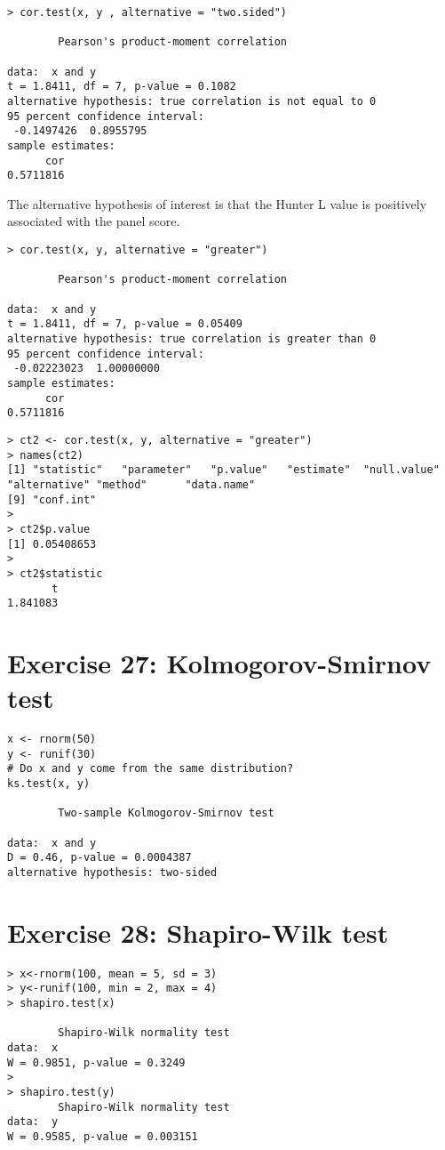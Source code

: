 \documentclass{article}
\begin{document}
\begin{verbatim}
> cor.test(x, y , alternative = "two.sided")

        Pearson's product-moment correlation

data:  x and y
t = 1.8411, df = 7, p-value = 0.1082
alternative hypothesis: true correlation is not equal to 0
95 percent confidence interval:
 -0.1497426  0.8955795
sample estimates:
      cor
0.5711816

\end{verbatim}


The alternative hypothesis of interest is that the
Hunter L value is positively associated with the panel score.
\begin{verbatim}
> cor.test(x, y, alternative = "greater")

        Pearson's product-moment correlation

data:  x and y
t = 1.8411, df = 7, p-value = 0.05409
alternative hypothesis: true correlation is greater than 0
95 percent confidence interval:
 -0.02223023  1.00000000
sample estimates:
      cor
0.5711816
\end{verbatim}

\begin{verbatim}
> ct2 <- cor.test(x, y, alternative = "greater")
> names(ct2)
[1] "statistic"   "parameter"   "p.value"   "estimate"  "null.value"  "alternative" "method"      "data.name"
[9] "conf.int"
>
> ct2$p.value
[1] 0.05408653
>
> ct2$statistic
       t
1.841083
\end{verbatim}

\section*{Exercise 27: Kolmogorov-Smirnov test}

\begin{verbatim}
x <- rnorm(50)
y <- runif(30)
# Do x and y come from the same distribution?
ks.test(x, y)

        Two-sample Kolmogorov-Smirnov test

data:  x and y
D = 0.46, p-value = 0.0004387
alternative hypothesis: two-sided
\end{verbatim}


\section*{Exercise 28: Shapiro-Wilk test}

\begin{verbatim}
> x<-rnorm(100, mean = 5, sd = 3)
> y<-runif(100, min = 2, max = 4)
> shapiro.test(x)

        Shapiro-Wilk normality test
data:  x
W = 0.9851, p-value = 0.3249
>
> shapiro.test(y)
        Shapiro-Wilk normality test
data:  y
W = 0.9585, p-value = 0.003151

\end{verbatim}
\newpage
\end{document}

